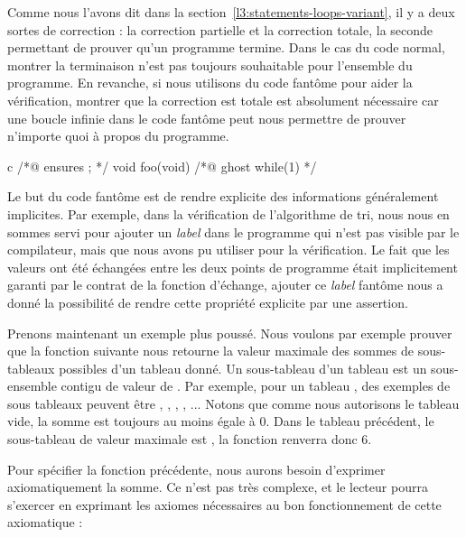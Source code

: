 Comme nous l'avons dit dans la section~\ref{l3:statements-loops-variant}, il y
a deux sortes de correction : la correction partielle et la correction totale,
la seconde permettant de prouver qu'un programme termine. Dans le cas du code
normal, montrer la terminaison n'est pas toujours souhaitable pour l'ensemble
du programme. En revanche, si nous utilisons du code fantôme pour aider la
vérification, montrer que la correction est totale est absolument nécessaire
car une boucle infinie dans le code fantôme peut nous permettre de prouver
n'importe quoi à propos du programme.


\begin{CodeBlock}{c}
/*@ ensures \false ; */
void foo(void){
  /*@ ghost
    while(1){}
  */
}
\end{CodeBlock}




Le but du code fantôme est de rendre explicite des informations généralement
implicites. Par exemple, dans la vérification de l'algorithme de tri, nous nous en
sommes servi pour ajouter un \textit{label} dans le programme qui n'est pas
visible par le compilateur, mais que nous avons pu utiliser pour la vérification.
Le fait que les valeurs ont été échangées entre les deux points de programme était
implicitement garanti par le contrat de la fonction d'échange, ajouter ce
\textit{label} fantôme nous a donné la possibilité de rendre cette propriété
explicite par une assertion.



Prenons maintenant un exemple plus poussé. Nous voulons par exemple prouver que
la fonction suivante nous retourne la valeur maximale des sommes de sous-tableaux
possibles d'un tableau donné. Un sous-tableau d'un tableau  est un
sous-ensemble contigu de valeur de . Par exemple, pour un tableau
, des exemples de sous tableaux peuvent être
\CodeInline{\{\}}, , ,
, ... Notons que comme nous autorisons le
tableau vide, la somme est toujours au moins égale à 0. Dans le tableau précédent,
le sous-tableau de valeur maximale est , la fonction
renverra donc 6.






Pour spécifier la fonction précédente, nous aurons besoin d'exprimer
axiomatiquement la somme. Ce n'est pas très complexe, et le lecteur pourra
s'exercer en exprimant les axiomes nécessaires au bon fonctionnement de cette
axiomatique :



